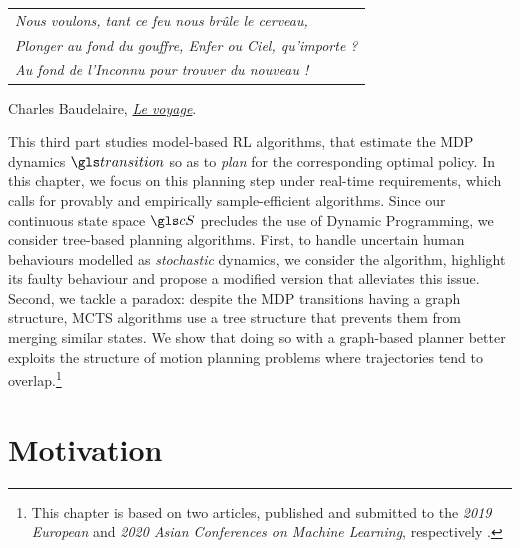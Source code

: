 
\graphicspath{{2-Chapters/6-Chapter/}}

\label{chapter:6}

\begin{flushright}
	\begin{tabular}{@{}l@{}}
		\emph{Nous voulons, tant ce feu nous brûle le cerveau,}\\
		\emph{Plonger au fond du gouffre, Enfer ou Ciel, qu’importe ?}\\
		\emph{Au fond de l’Inconnu pour trouver du nouveau !}\\
	\end{tabular}
	
	Charles Baudelaire, \href{https://eleurent.github.io/sisyphe/texts/le-voyage.html}{\emph{Le voyage}}.
\end{flushright}

\abstractStartChapter{}%

This third part studies model-based \gls{RL} algorithms, that estimate the \gls{MDP} dynamics $\Ps$ so as to \emph{plan} for the corresponding optimal policy.
In this chapter, we focus on this planning step under real-time requirements, which calls for provably and empirically sample-efficient algorithms. Since our continuous state space $\cS$ precludes the use of Dynamic Programming, we consider tree-based planning algorithms. First, to handle uncertain human behaviours modelled as \emph{stochastic} dynamics, we consider the \OLOP algorithm, highlight its faulty behaviour and propose a modified version that alleviates this issue. Second, we tackle a paradox: despite the \gls{MDP} transitions having a graph structure, \gls{MCTS} algorithms use a tree structure that prevents them from merging similar states. We show that doing so with a graph-based planner better exploits the structure of motion planning problems where trajectories tend to overlap.\footnote{This chapter is based on two articles, published and submitted to the \emph{2019 European} and \emph{2020 Asian Conferences on Machine Learning}, respectively \citep{Leurent2020practical,Leurent2020monte}.}
\minitocStartChapter{}


\section{Motivation}

